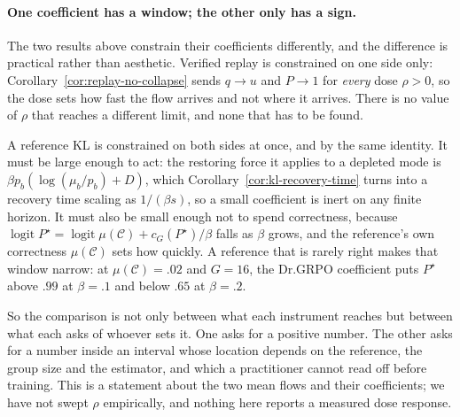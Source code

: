 \documentclass{article}
\newcommand{\1}{\mathbf 1}
\theoremstyle{remark}
\theoremstyle{definition}
\theoremstyle{plain}
\begin{document}
\paragraph{One coefficient has a window; the other only has a sign.}
The two results above constrain their coefficients differently, and the
difference is practical rather than aesthetic. Verified replay is constrained
on one side only: Corollary~\ref{cor:replay-no-collapse} sends $q\to u$ and
$P\to1$ for \emph{every} dose $\rho>0$, so the dose sets how fast the flow
arrives and not where it arrives. There is no value of $\rho$ that reaches a
different limit, and none that has to be found.

A reference KL is constrained on both sides at once, and by the same identity.
It must be large enough to act: the restoring force it applies to a depleted
mode is $\beta p_b(\log(\mu_b/p_b)+D)$, which
Corollary~\ref{cor:kl-recovery-time} turns into a recovery time scaling as
$1/(\beta s)$, so a small coefficient is inert on any finite horizon. It must
also be small enough not to spend correctness, because
$\operatorname{logit}P^\star=\operatorname{logit}\mu(\mathcal C)+c_G(P^\star)/\beta$
falls as $\beta$ grows, and the reference's own correctness $\mu(\mathcal C)$
sets how quickly. A reference that is rarely right makes that window narrow:
at $\mu(\mathcal C)=.02$ and $G=16$, the Dr.GRPO coefficient puts $P^\star$
above $.99$ at $\beta=.1$ and below $.65$ at $\beta=.2$.

So the comparison is not only between what each instrument reaches but between
what each asks of whoever sets it. One asks for a positive number. The other
asks for a number inside an interval whose location depends on the reference,
the group size and the estimator, and which a practitioner cannot read off
before training. This is a statement about the two mean flows and their
coefficients; we have not swept $\rho$ empirically, and nothing here reports a
measured dose response.
\end{document}
